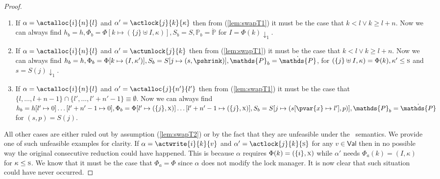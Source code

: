 \begin{lem}
\begin{proof}
\begin{enumerate}[label=({\roman*})]
		\item If $\alpha = \actalloc{i}{n}{l}$ and $\alpha' = \actlock{j}{k}{\kappa}$ then from (\ref{lem:swapT1}) it must be the case that $k < l \lor k \geq l + n$. Now we can always find $h_b = h, \Phi_b = \Phi[k \mapsto (\{j\} \uplus I, \kappa)], S_b = S, \mathds{P}_b = \dot{\mathds{P}}$ for $I = \Phi(k) \downarrow_1$.
		
		\item If $\alpha = \actalloc{i}{n}{l}$ and $\alpha' = \actunlock{j}{k}$ then from (\ref{lem:swapT1}) it must be the case that $k < l \lor k \geq l + n$. Now we can always find $h_b = h, \Phi_b = \Phi[k \mapsto (I, \kappa')], S_b = S[j \mapsto (s, \pshrink)], \mathds{P}_b = \dot{\mathds{P}}$, for $(\{j\} \uplus I, \kappa) = \Phi(k), \kappa' \leq \textsc{s}$ and $s = S(j) \downarrow_1$.
		
		\item If $\alpha = \actalloc{i}{n}{l}$ and $\alpha' = \actalloc{j}{n'}{l'}$ then from (\ref{lem:swapT1}) it must be the case that $\{l, \ldots, l + n - 1\} \cap \{l', \ldots, l' + n' -1 \} \equiv \emptyset$. Now we can always find $h_b = h[l' \mapsto 0]\ldots[l' + n' - 1 \mapsto 0], \Phi_b = \Phi[l' \mapsto (\{j\}, \textsc{x})]\ldots[l' + n' - 1 \mapsto (\{j\}, \textsc{x})], S_b = S[j \mapsto (s[\pvar{x} \mapsto l'], p)], \mathds{P}_b = \dot{\mathds{P}}$ for $(s, p) = S(j)$.
	\end{enumerate}
	All other cases are either ruled out by assumption (\ref{lem:swapT2}) or by the fact that they are unfeasible under the \tpl\ semantics. We provide one of such unfeasible examples for clarity. If $\alpha = \actwrite{i}{k}{v}$ and $\alpha' = \actlock{j}{k}{\textsc{s}}$ for any $v \in \mathsf{Val}$ then in no possible way the original consecutive reduction could have happened. This is because $\alpha$ requires $\Phi(k) = (\{i\}, \textsc{x})$ while $\alpha'$ needs $\Phi_a(k) = (I, \kappa)$ for $\kappa \leq \textsc{s}$. We know that it must be the case that $\Phi_a = \Phi$ since $\alpha$ does not modify the lock manager. It is now clear that such situation could have never occurred.
	\end{proof}
\end{lem}

